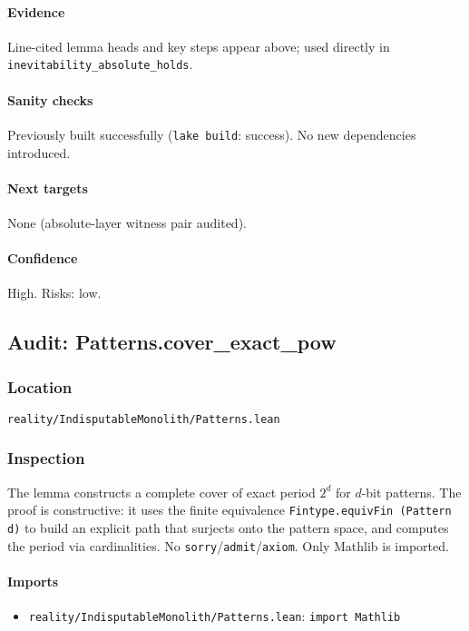 \documentclass{article}
\newcommand{\FileRef}[1]{\texttt{#1}}
\begin{document}
\paragraph{Evidence}
Line-cited lemma heads and key steps appear above; used directly in \texttt{inevitability\_absolute\_holds}.

\paragraph{Sanity checks}
Previously built successfully (\texttt{lake build}: success). No new dependencies introduced.

\paragraph{Next targets} None (absolute-layer witness pair audited).

\paragraph{Confidence} High. Risks: low.

\subsection{Audit: Patterns.cover\_exact\_pow}
\subsubsection{Location}
\FileRef{reality/IndisputableMonolith/Patterns.lean}

\subsubsection{Inspection}
The lemma constructs a complete cover of exact period \(2^d\) for \(d\)-bit patterns. The proof is constructive: it uses the finite equivalence \texttt{Fintype.equivFin (Pattern d)} to build an explicit path that surjects onto the pattern space, and computes the period via cardinalities. No \texttt{sorry}/\texttt{admit}/\texttt{axiom}. Only Mathlib is imported.

\paragraph{Imports}
\begin{itemize}[leftmargin=*]
  \item \FileRef{reality/IndisputableMonolith/Patterns.lean}: \texttt{import Mathlib}
\end{itemize}
\end{document}
